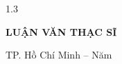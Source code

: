 \thispagestyle{empty}
\begin{center}
\begin{spacing}{1.3}

{\fontsize{14}{17}\selectfont \dhqg \par}
{\fontsize{14}{17}\selectfont \bfseries \truong \par}

\vspace{2.5cm}

{\fontsize{14}{17}\selectfont \bfseries \MakeUppercase{\hvchname} \par}

\vspace{2.5cm}

{\fontsize{16}{20}\selectfont \bfseries \MakeUppercase{\thesistitle} \par}

\vspace{2.5cm}

{\fontsize{14}{17}\selectfont \bfseries LUẬN VĂN THẠC SĨ \par}

\vfill

{\fontsize{12}{15}\selectfont TP. Hồ Chí Minh {–} Năm \nambaove \par}

\end{spacing}
\end{center}
\clearpage
